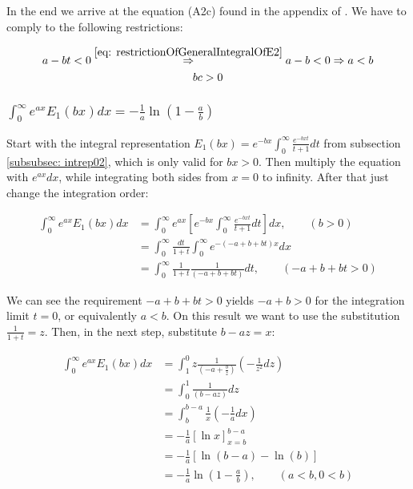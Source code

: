 \documentclass[bibliography=totocnumbered]{scrartcl}
\newcommand{\assume}[1][\text{MISSING PARAMETER}]{,\qquad\left(#1\right)}
\begin{document}
	In the end we arrive at the equation (A2c) found in the appendix of \cite{boer1990calc}. We have to comply to the following restrictions:
	
	\begin{subequations}
		\begin{gather}
			a-bt<0\overset{\eqref{eq: restrictionOfGeneralIntegralOfE2}}{\Rightarrow}a-b<0\Rightarrow{}a<b\\
			bc>0
		\end{gather}
	\end{subequations}
	
	\subsubsection[A integral of E1, involving the exponential function]{$\int_{0}^{\infty}e^{ax}E_1\left(bx\right)dx=-\frac{1}{a}\ln\left(1-\frac{a}{b}\right)$}
	\label{subsubsec: generalIntegralOfE3}
	
	Start with the integral representation $E_1\left(bx\right)=e^{-bx}\int_{0}^{\infty}\frac{e^{-bxt}}{t+1}dt$ from subsection \ref{subsubsec: intrep02}, which is only valid for $bx>0$. Then multiply the equation with $e^{ax}dx$, while integrating both sides from $x=0$ to infinity. After that just change the integration order:
	
	\begin{align}
		\int_{0}^{\infty}e^{ax}E_1\left(bx\right)dx&=\int_{0}^{\infty}e^{ax}\left[e^{-bx}\int_{0}^{\infty}\frac{e^{-bxt}}{t+1}dt\right]dx\assume[b>0]\\
		&=\int_{0}^{\infty}\frac{dt}{1+t}\int_{0}^{\infty}e^{-\left(-a+b+bt\right)x}dx\\
		&=\int_{0}^{\infty}\frac{1}{1+t}\frac{1}{\left(-a+b+bt\right)}dt\assume[-a+b+bt>0]
	\end{align}
	
	We can see the requirement $-a+b+bt>0$ yields $-a+b>0$ for the integration limit $t=0$, or equivalently $a<b$. On this result we want to use the substitution $\frac{1}{1+t}=z$. Then, in the next step, substitute $b-az=x$:
	
	\begin{align}
		\int_{0}^{\infty}e^{ax}E_1\left(bx\right)dx&=\int_{1}^{0}z\frac{1}{\left(-a+\frac{b}{z}\right)}\left(-\frac{1}{z^2}dz\right)\\
		&=\int_{0}^{1}\frac{1}{\left(b-az\right)}dz\\
		&=\int_{b}^{b-a}\frac{1}{x}\left(-\frac{1}{a}dx\right)\\
		&=-\frac{1}{a}\left[\ln{x}\right]^{b-a}_{x=b}\\
		&=-\frac{1}{a}\left[\ln{\left(b-a\right)}-\ln{\left(b\right)}\right]\\
		&=-\frac{1}{a}\ln{\left(1-\frac{a}{b}\right)}\assume[a<b, 0<b]\label{eq: generalIntegralOfE3}
	\end{align}
	
\end{document}
